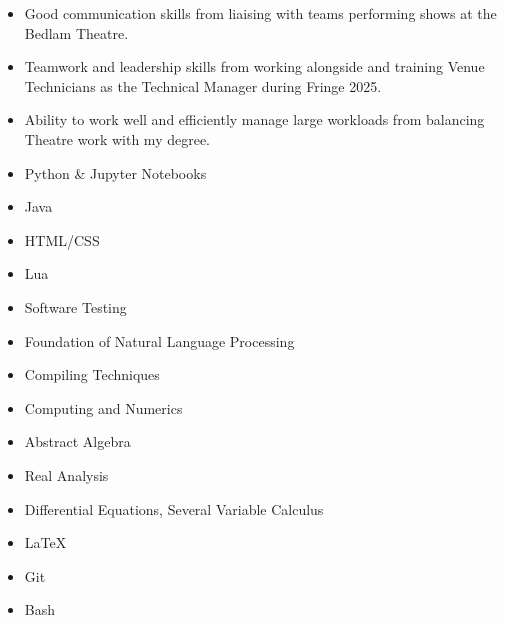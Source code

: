 \documentclass[../../cv-cs.tex]{subfiles}
\begin{document}
\begin{itemize}
	\item Good communication skills from liaising with teams performing shows at the Bedlam Theatre.
	\item Teamwork and leadership skills from working alongside and training Venue Technicians as the Technical Manager during Fringe 2025.
	\item Ability to work well and efficiently manage large workloads from balancing Theatre work with my degree. 
\end{itemize}

\begin{itemize}
	\item Python \& Jupyter Notebooks
	\item Java
	\item HTML/CSS
	\item Lua
\end{itemize}

\begin{itemize}
	\item Software Testing
	\item Foundation of Natural Language Processing
	\item Compiling Techniques
	\item Computing and Numerics
\end{itemize}

\begin{itemize}
	\item Abstract Algebra
	\item Real Analysis
	\item Differential Equations, Several Variable Calculus
\end{itemize}

\begin{itemize}
	\item LaTeX
	\item Git
	\item Bash
\end{itemize}
\end{document}
